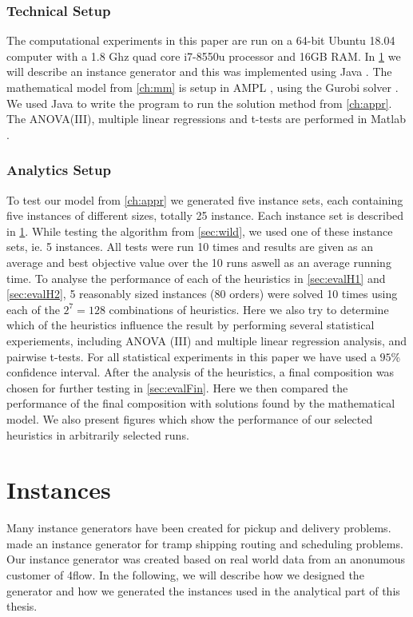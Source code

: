 \documentclass[../main.tex]{subfiles}
\begin{document}
\subsubsection{Technical Setup}
The computational experiments in this paper are run on a 64-bit Ubuntu 18.04 computer with a 1.8 Ghz quad core i7-8550u processor and 16GB RAM. 
In \cref{sec:ins} we will describe an instance generator and this was implemented using Java \citep{java}.
The mathematical model from \cref{ch:mm} is setup in AMPL \citep{ampl}, using the Gurobi solver \citep{gurobi}.  
We used Java \citep{java} to write the program to run the solution method from \cref{ch:appr}.
The ANOVA(III), multiple linear regressions and t-tests are performed in Matlab \citep{matlab}.

\subsubsection{Analytics Setup}
To test our model from \ref{ch:appr} we generated five instance sets, each containing five instances of different sizes, totally 25 instance. 
Each instance set is described in \cref{sec:ins}.
While testing the algorithm from \cref{sec:wild}, we used one of these instance sets, ie. 5 instances. 
All tests were run 10 times and results are given as an average and best objective value over the 10 runs aswell as an average running time.
To analyse the performance of each of the heuristics in \cref{sec:evalH1} and \cref{sec:evalH2}, 5 reasonably sized instances (80 orders) were solved 10 times using each of the $2^7 = 128$ combinations of heuristics.
Here we also try to determine which of the heuristics influence the result by performing several statistical experiements, including ANOVA (III) and multiple linear regression analysis, and pairwise t-tests.
For all statistical experiments in this paper we have used a $95\%$ confidence interval.
After the analysis of the heuristics, a final composition was chosen for further testing in \cref{sec:evalFin}.
Here we then compared the performance of the final composition with solutions found by the mathematical model. 
We also present figures which show the performance of our selected heuristics in arbitrarily selected runs.

\section{Instances}
\label{sec:ins}
Many instance generators have been created for pickup and delivery problems. \cite{hemmati14} made an instance generator for tramp shipping routing and scheduling problems.
Our instance generator was created based on real world data from an anonumous customer of 4flow.
In the following, we will describe how we designed the generator and how we generated the instances used in the analytical part of this thesis.
\end{document}
